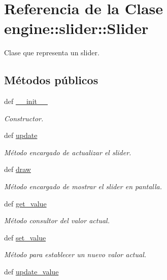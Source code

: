 \hypertarget{classengine_1_1slider_1_1Slider}{
\section{\-Referencia de la \-Clase engine\-:\-:slider\-:\-:\-Slider}
\label{classengine_1_1slider_1_1Slider}
}


\-Clase que representa un slider.  


\subsection*{\-Métodos públicos}
\begin{DoxyCompactItemize}
\item 
def \hyperlink{classengine_1_1slider_1_1Slider_a57ff9c5ff1f3c300bea06281f502b121}{\-\_\-\-\_\-init\-\_\-\-\_\-}
\begin{DoxyCompactList}\small\item\em \-Constructor. \end{DoxyCompactList}\item 
\hypertarget{classengine_1_1slider_1_1Slider_a260f11f9644268b4c0a8f568389cdb21}{
def \hyperlink{classengine_1_1slider_1_1Slider_a260f11f9644268b4c0a8f568389cdb21}{update}}
\label{classengine_1_1slider_1_1Slider_a260f11f9644268b4c0a8f568389cdb21}

\begin{DoxyCompactList}\small\item\em \-Método encargado de actualizar el slider. \end{DoxyCompactList}\item 
def \hyperlink{classengine_1_1slider_1_1Slider_adf934b6e0c2b8a40306995aebebc7d7c}{draw}
\begin{DoxyCompactList}\small\item\em \-Método encargado de mostrar el slider en pantalla. \end{DoxyCompactList}\item 
def \hyperlink{classengine_1_1slider_1_1Slider_ac4f0d9985619ed2d4b7708b25f731de0}{get\-\_\-value}
\begin{DoxyCompactList}\small\item\em \-Método consultor del valor actual. \end{DoxyCompactList}\item 
def \hyperlink{classengine_1_1slider_1_1Slider_af24cad91a9d73e711e624cd2b5e1aa5b}{set\-\_\-value}
\begin{DoxyCompactList}\small\item\em \-Método para establecer un nuevo valor actual. \end{DoxyCompactList}\item 
\hypertarget{classengine_1_1slider_1_1Slider_a6afb84c66e73c87c29491a377a2f1d9c}{
def \hyperlink{classengine_1_1slider_1_1Slider_a6afb84c66e73c87c29491a377a2f1d9c}{update\-\_\-value}}
\label{classengine_1_1slider_1_1Slider_a6afb84c66e73c87c29491a377a2f1d9c}


\end{DoxyCompactItemize}
